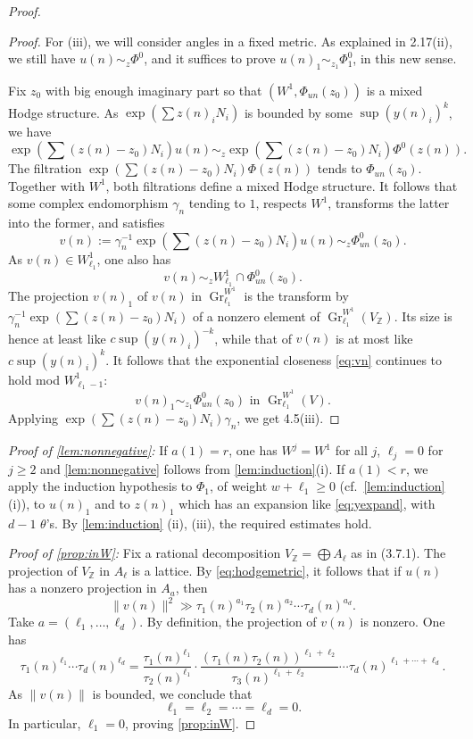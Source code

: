 \documentclass[11pt,a4paper]{article}
\theoremstyle{plain}
\theoremstyle{definition}
\DeclareMathOperator{\Gr}{Gr}
\begin{document}
\begin{proof}
\begin{proof}
For (iii), we will consider angles in a fixed metric. As explained in 2.17(ii), we still have $u(n)\sim_z\Phi^0$, and it suffices to prove $u(n)_1\sim_{z_1}\Phi_1^0$, in this new sense.

Fix $z_0$ with big enough imaginary part so that $(W^1,\Phi_{un}(z_0))$ is a mixed Hodge structure. As $\exp(\sum z(n)_i N_i)$ is bounded by some $\sup(y(n)_i)^k$, we have
\[
\exp(\sum(z(n)-z_0)N_i)u(n)\sim_z\exp(\sum(z(n)-z_0)N_i)\Phi^0(z(n)).
\]
The filtration $\exp(\sum(z(n)-z_0)N_i)\Phi(z(n))$ tends to $\Phi_{un}(z_0)$. Together with $W^1$, both filtrations define a mixed Hodge structure. It follows that some complex endomorphism $\gamma_n$ tending to $1$, respects $W^1$, transforms the latter into the former, and satisfies
\[
v(n):=\gamma_n^{-1}\exp(\sum(z(n)-z_0)N_i)u(n)\sim_z\Phi_{un}^0(z_0).
\]
As $v(n)\in W^1_{\ell_1}$, one also has
\begin{equation}\label{eq:vn}
v(n)\sim_z W^1_{\ell_1}\cap\Phi_{un}^0(z_0).
\end{equation}
The projection $v(n)_1$ of $v(n)$ in $\Gr_{\ell_1}^{W^1}$ is the transform by $\gamma_n^{-1}\exp(\sum(z(n)-z_0)N_i)$ of a nonzero element of $\Gr_{\ell_1}^{W^1}(V_{\mathbb{Z}})$. Its size is hence at least like $c\sup(y(n)_i)^{-k}$, while that of $v(n)$ is at most like $c\sup(y(n)_i)^k$. It follows that the exponential closeness \eqref{eq:vn} continues to hold mod $W^1_{\ell_1-1}$:
\[
v(n)_1\sim_{z_1}\Phi_{un}^0(z_0)\text{ in }\Gr_{\ell_1}^{W^1}(V).
\]
Applying $\exp(\sum(z(n)-z_0)N_i)\gamma_n$, we get 4.5(iii).
\end{proof}

\noindent\textit{Proof of \ref{lem:nonnegative}:} If $a(1)=r$, one has $W^j=W^1$ for all $j$, $\ell_j=0$ for $j\geq 2$ and \ref{lem:nonnegative} follows from \ref{lem:induction}(i). If $a(1)<r$, we apply the induction hypothesis to $\Phi_1$, of weight $w+\ell_1\geq 0$ (cf.\ \ref{lem:induction}(i)), to $u(n)_1$ and to $z(n)_1$ which has an expansion like \eqref{eq:yexpand}, with $d-1$ $\theta$'s. By \ref{lem:induction} (ii), (iii), the required estimates hold.

\textit{Proof of \ref{prop:inW}:} Fix a rational decomposition $V_{\mathbb{Z}}=\bigoplus A_{\ell}$ as in (3.7.1). The projection of $V_{\mathbb{Z}}$ in $A_{\ell}$ is a lattice. By \eqref{eq:hodgemetric}, it follows that if $u(n)$ has a nonzero projection in $A_a$, then
\[
\|v(n)\|^2\gg\tau_1(n)^{a_1}\tau_2(n)^{a_2}\cdots\tau_d(n)^{a_d}.
\]
Take $a=(\ell_1,\dots,\ell_d)$. By definition, the projection of $v(n)$ is nonzero. One has
\[
\tau_1(n)^{\ell_1}\cdots\tau_d(n)^{\ell_d}=\frac{\tau_1(n)^{\ell_1}}{\tau_2(n)^{\ell_1}}\cdot\frac{(\tau_1(n)\tau_2(n))^{\ell_1+\ell_2}}{\tau_3(n)^{\ell_1+\ell_2}}\cdots\tau_d(n)^{\ell_1+\cdots+\ell_d}.
\]
As $\|v(n)\|$ is bounded, we conclude that
\[
\ell_1=\ell_2=\cdots=\ell_d=0.
\]
In particular, $\ell_1=0$, proving \ref{prop:inW}.
\end{proof}
\end{document}
